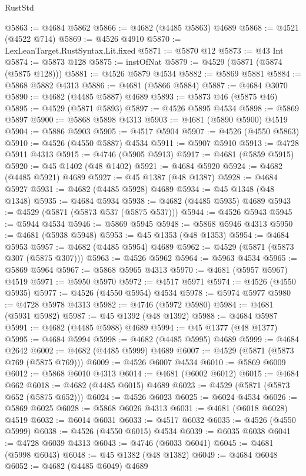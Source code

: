 \begin{lexlean}{RustStd}
\begin{coremodule}
@5863 := @4684 @5862
@5866 := @4682 (@4485 @5863) @4689
@5868 := @4521 (@4522 @714)
@5869 := @4526 @4910
@5870 := LexLeanTarget.RustSyntax.Lit.fixed
@5871 := @5870 @12
@5873 := @43 Int
@5874 := @5873 @128
@5875 := instOfNat
@5879 := @4529 (@5871 (@5874 (@5875 @128)))
@5881 := @4526 @5879 @4534
@5882 := @5869 @5881
@5884 := @5868 @5882 @4313
@5886 := @4681 (@5866 @5884)
@5887 := @4684 @3070
@5890 := @4682 (@4485 @5887) @4689
@5893 := @5873 @46 (@5875 @46)
@5895 := @4529 (@5871 @5893)
@5897 := @4526 @5895 @4534
@5898 := @5869 @5897
@5900 := @5868 @5898 @4313
@5903 := @4681 (@5890 @5900) @4519
@5904 := @5886 @5903
@5905 := @4517 @5904
@5907 := @4526 (@4550 @5863)
@5910 := @4526 (@4550 @5887) @4534
@5911 := @5907 @5910
@5913 := @4728 @5911 @4313
@5915 := @4746 (@5905 @5913)
@5917 := @4681 (@5859 @5915)
@5920 := @45 @1402 (@48 @1402)
@5921 := @4684 @5920
@5924 := @4682 (@4485 @5921) @4689
@5927 := @45 @1387 (@48 @1387)
@5928 := @4684 @5927
@5931 := @4682 (@4485 @5928) @4689
@5934 := @45 @1348 (@48 @1348)
@5935 := @4684 @5934
@5938 := @4682 (@4485 @5935) @4689
@5943 := @4529 (@5871 (@5873 @537 (@5875 @537)))
@5944 := @4526 @5943
@5945 := @5944 @4534
@5946 := @5869 @5945
@5948 := @5868 @5946 @4313
@5950 := @4681 (@5938 @5948)
@5953 := @45 @1353 (@48 @1353)
@5954 := @4684 @5953
@5957 := @4682 (@4485 @5954) @4689
@5962 := @4529 (@5871 (@5873 @307 (@5875 @307)))
@5963 := @4526 @5962
@5964 := @5963 @4534
@5965 := @5869 @5964
@5967 := @5868 @5965 @4313
@5970 := @4681 (@5957 @5967) @4519
@5971 := @5950 @5970
@5972 := @4517 @5971
@5974 := @4526 (@4550 @5935)
@5977 := @4526 (@4550 @5954) @4534
@5978 := @5974 @5977
@5980 := @4728 @5978 @4313
@5982 := @4746 (@5972 @5980)
@5984 := @4681 (@5931 @5982)
@5987 := @45 @1392 (@48 @1392)
@5988 := @4684 @5987
@5991 := @4682 (@4485 @5988) @4689
@5994 := @45 @1377 (@48 @1377)
@5995 := @4684 @5994
@5998 := @4682 (@4485 @5995) @4689
@5999 := @4684 @2642
@6002 := @4682 (@4485 @5999) @4689
@6007 := @4529 (@5871 (@5873 @769 (@5875 @769)))
@6009 := @4526 @6007 @4534
@6010 := @5869 @6009
@6012 := @5868 @6010 @4313
@6014 := @4681 (@6002 @6012)
@6015 := @4684 @662
@6018 := @4682 (@4485 @6015) @4689
@6023 := @4529 (@5871 (@5873 @652 (@5875 @652)))
@6024 := @4526 @6023
@6025 := @6024 @4534
@6026 := @5869 @6025
@6028 := @5868 @6026 @4313
@6031 := @4681 (@6018 @6028) @4519
@6032 := @6014 @6031
@6033 := @4517 @6032
@6035 := @4526 (@4550 @5999)
@6038 := @4526 (@4550 @6015) @4534
@6039 := @6035 @6038
@6041 := @4728 @6039 @4313
@6043 := @4746 (@6033 @6041)
@6045 := @4681 (@5998 @6043)
@6048 := @45 @1382 (@48 @1382)
@6049 := @4684 @6048
@6052 := @4682 (@4485 @6049) @4689

\end{coremodule}
\end{lexlean}
